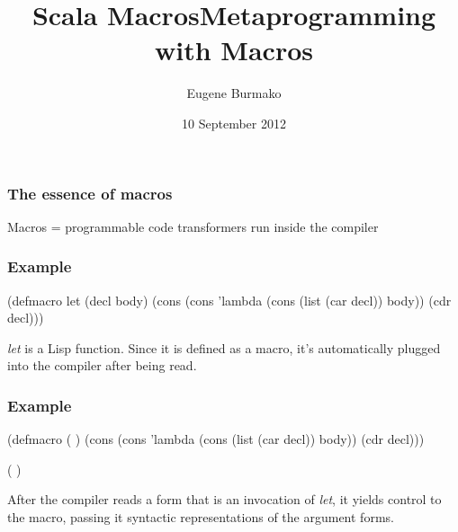 \documentclass[hyperref={bookmarks=false}]{beamer}
\title{Scala Macros}
\begin{document}
\title{Metaprogramming with Macros}
\author{Eugene Burmako}
\date{10 September 2012}
{
\begin{frame}
  \titlepage
\end{frame}
}

\begin{frame}[fragile]
\frametitle{The essence of macros}
Macros = programmable code transformers run inside the compiler
\end{frame}

\begin{frame}[fragile]
\frametitle{Example} %

\begin{lstlistinglike}
\begin{semiverbatim}
(\alert{defmacro} let (decl body)
  (cons
   (cons 'lambda
         (cons (list (car decl)) body))
   (cdr decl)))
\end{semiverbatim}
\end{lstlistinglike}

\emph{let} is a Lisp function. Since it is defined as a macro,
it's automatically plugged into the compiler after being read.
\end{frame}

\begin{frame}[fragile]
\frametitle{Example} %

\begin{lstlistinglike}
\begin{semiverbatim}
(defmacro \text{\color{blue}{let}} (\text{\color{red}{decl}} \text{\color{violet}{body}})
  (cons
   (cons 'lambda
         (cons (list (car decl)) body))
   (cdr decl)))

(\text{\color{blue}{let}} \text{\color{red}{(x 42)}} \text{\color{violet}{(print x)}})
\end{semiverbatim}
\end{lstlistinglike}

After the compiler reads a form that is an invocation of \emph{let},
it yields control to the macro, passing it syntactic representations of the argument forms.
\end{frame}
\end{document}
